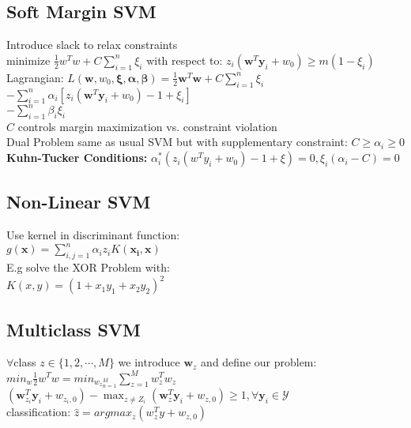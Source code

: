 \subsection*{Soft Margin SVM}
Introduce slack to relax constraints\\
minimize $\frac{1}{2}w^Tw + C\sum_{i=1}^n \xi_i$ with respect to: 
$z_i(\mathbf{w}^T\mathbf{y}_i+w_0)\geq m(1-\xi_i)$\\
Lagrangian: $L(\mathbf{w}, w_0,\mathbf{\xi}, \mathbf{\alpha}, \mathbf{\beta}) {=}\frac{1}{2}\mathbf{w}^T\mathbf{w}+C\sum_{i=1}^n\xi_i$
${-}\sum_{i=1}^n\alpha_i[z_i(\mathbf{w}^T\mathbf{y}_i{+}w_0){-}1{+}\xi_i]$\\
${-}\sum_{i=1}^n\beta_i\xi_i$\\
$C$ controls margin maximization vs. constraint violation\\
Dual Problem same as usual SVM but with supplementary constraint:
$C \geq \alpha_i \geq 0$
\textbf{Kuhn-Tucker Conditions:} 
$\alpha_i^*(z_i(w^Ty_i+w_0)-1 + \xi)= 0, \xi_i(\alpha_i-C) = 0$
\subsection*{Non-Linear SVM}
Use kernel in discriminant function: \\ $g(\mathbf{x})=\sum_{i,j=1}^n\alpha_iz_iK(\mathbf{x_i},\mathbf{x})$\\
E.g solve the XOR Problem with: \\
$K(x,y)=(1+x_1y_1+x_2y_2)^2$

\subsection*{Multiclass SVM}
$\forall$class $z\in\{1,2,\cdots,M\}$ we introduce $\mathbf{w}_z$ and define our problem:\\
$min_w \frac{1}{2}w^Tw = min_{{w_z}_{n=1}^M} \sum_{z=1}^M w_z^Tw_z$
$(\mathbf{w}_{z_i}^T\mathbf{y}_i+w_{z_i,0})-\max_{z\not=Z_i}(\mathbf{w}_z^T\mathbf{y}_i+w_{z,0})\geq 1, \forall {\mathbf{y}_i\in \mathcal{Y}}$ \\
classification: $\hat z = argmax_z (w_z^Ty + w_{z,0})$

